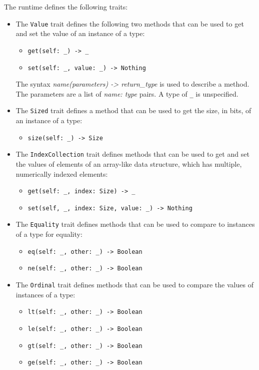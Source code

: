 \documentclass[10pt,twocolumn,a4paper]{article}
\newcommand{\code}[1]{\texttt{#1}}
\begin{document}
The runtime defines the following traits:
\begin{itemize}
  \item The \code{Value} trait defines the following two methods that can
    be used to get and set the value of an instance of a type:
    \begin{itemize}
      \item \texttt{get(self: \_) -> \_}
      \item \texttt{set(self: \_, value: \_) -> Nothing}
    \end{itemize}
    The syntax \emph{name(parameters) -> return\_type} is used to
    describe a method. The parameters are a  list of \emph{name: type}
    pairs. A type of \texttt{\_} is unspecified.

  \item The \code{Sized} trait defines a method that can be used to get the
    size, in bits, of an instance of a type:
    \begin{itemize}
      \item \texttt{size(self: \_) -> Size}
    \end{itemize}

  \item The \code{IndexCollection} trait defines methods that can be used
    to get and set the values of elements of an array-like data structure,
    which has multiple, numerically indexed elements:
    \begin{itemize}
      \item \texttt{get(self: \_, index: Size) -> \_}
      \item \texttt{set(self, \_, index: Size, value: \_) -> Nothing}
    \end{itemize}

  \item The \code{Equality} trait defines methods that can be used to
    compare to instances of a type for equality:
    \begin{itemize}
      \item \texttt{eq(self: \_, other: \_) -> Boolean}
      \item \texttt{ne(self: \_, other: \_) -> Boolean}
    \end{itemize}

  \item The \code{Ordinal} trait defines methods that can be used to
    compare the values of instances of a type:
    \begin{itemize}
      \item \texttt{lt(self: \_, other: \_) -> Boolean}
      \item \texttt{le(self: \_, other: \_) -> Boolean}
      \item \texttt{gt(self: \_, other: \_) -> Boolean}
      \item \texttt{ge(self: \_, other: \_) -> Boolean}
    \end{itemize}


\end{itemize}
\end{document}
